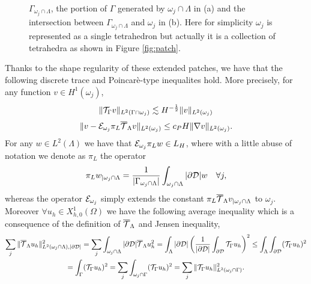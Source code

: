 \begin{figure}\label{fig:gamma_generated}
\centering
{}
\qquad \qquad
{}
\caption{$\Gamma_{\omega_j \cap \Lambda}$, the portion of $\Gamma$ generated by $\omega_j \cap \Lambda$ in (a) and the intersection between $\Gamma_{\omega_j \cap \Lambda}$ and $\omega_j$ in (b). Here for simplicity $\omega_j$ is represented as a single tetrahedron but actually it is a collection of tetrahedra as shown in Figure \ref{fig:patch}.}
\end{figure}
Thanks to the shape regularity of these extended patches, we have that the following discrete trace and Poincarè-type inequalites hold. More precisely, for any function $v\in H^1(\omega_j)$, 
\begin{equation}\label{discr_trace_ineq}
\|\trace v\|_{L^2(\Gamma\cap \omega_j)} \lesssim H^{-\frac 12} \|v\|_{L^2(\omega_j)}
\end{equation}
\begin{equation}\label{disc_poincare_ineq}
\|v- \mathcal{E}_{\patch} \pi_L\mtrace v\|_{L^2(\omega_j)} \leq c_P H \|\nabla v\|_{L^2(\omega_j)}.
\end{equation}
For any $w \in L^2(\Lambda)$ we have that $ \mathcal{E}_{\omega _j}\pi_Lw \in L_H$, where with a little abuse of notation we denote as $\pi_L$ the operator
\begin{equation}\label{eq:projector}
\pi_Lw_{|\patch \cap \Lambda} =\frac{1}{|\Gamma_{\patch\cap \Lambda}|}\int_{\patch\cap \Lambda}|\DD| w\quad \forall j,
\end{equation}   
whereas the operator $\mathcal{E}_{\omega _j}$ simply extends the constant $\pi_L{\overline{\mathcal{T}}_\Lambda} v_{|\omega _j \cap \Lambda}$ to $\omega _j$.
Moreover $\forall u_h \in X^1_{h,0}(\Omega)$ we have the following average inequality 
which is a consequence of the definition of ${\overline{\mathcal{T}}_\Lambda}$ and Jensen inequality,
\begin{multline}\label{eq:avrg_ineq}
\sum _j \|\mtrace u_h\|^2_{L^2(\patch \cap \Lambda),|\DD| }
= \sum _j\int_{\patch \cap \Lambda} |\DD| \mtrace u_h^2 
= \int_{\Lambda} |\DD| \left( \frac{1}{|\DD|} \int_{\DD} \trace u_h \right)^2
\leq \int_{\Lambda} \int_{\DD} (\trace u_h)^2
\\
= \int_{\Gamma} (\trace u_h)^2
= \sum _j \int_{\patch \cap \Gamma} (\trace u_h)^2
= \sum _j \|\trace u_h\|^2_{L^2(\patch \cap \Gamma)}.
\end{multline}
